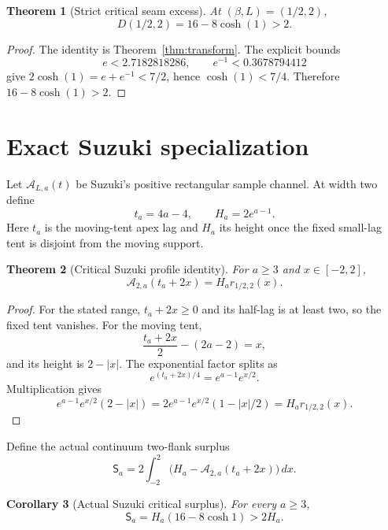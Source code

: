 \documentclass[11pt]{article}
\newtheorem{theorem}{Theorem}[section]
\newtheorem{corollary}[theorem]{Corollary}
\newcommand{\A}{\mathcal A}
\begin{document}
\begin{theorem}[Strict critical seam excess]\label{thm:critical}
At $(\beta,L)=(1/2,2)$,
\begin{equation}\label{eq:critical}
 D(1/2,2)=16-8\cosh(1)>2.
\end{equation}
\end{theorem}

\begin{proof}
The identity is Theorem~\ref{thm:transform}.  The explicit bounds
\[
 e<2.7182818286,\qquad e^{-1}<0.3678794412
\]
give $2\cosh(1)=e+e^{-1}<7/2$, hence $\cosh(1)<7/4$.  Therefore
$16-8\cosh(1)>2$.
\end{proof}

\section{Exact Suzuki specialization}

Let $\A_{L,a}(t)$ be Suzuki's positive rectangular sample channel.  At width two define
\[
 t_a=4a-4,\qquad H_a=2e^{a-1}.
\]
Here $t_a$ is the moving-tent apex lag and $H_a$ its height once the fixed small-lag tent is
disjoint from the moving support.

\begin{theorem}[Critical Suzuki profile identity]\label{thm:suzuki-profile}
For $a\ge3$ and $x\in[-2,2]$,
\begin{equation}\label{eq:suzuki-profile}
 \A_{2,a}(t_a+2x)=H_a r_{1/2,2}(x).
\end{equation}
\end{theorem}

\begin{proof}
For the stated range, $t_a+2x\ge0$ and its half-lag is at least two, so the fixed tent vanishes.
For the moving tent,
\[
 \frac{t_a+2x}{2}-(2a-2)=x,
\]
and its height is $2-|x|$.  The exponential factor splits as
\[
 e^{(t_a+2x)/4}=e^{a-1}e^{x/2}.
\]
Multiplication gives
\[
 e^{a-1}e^{x/2}(2-|x|)
 =2e^{a-1}e^{x/2}(1-|x|/2)=H_a r_{1/2,2}(x).
\]
\end{proof}

Define the actual continuum two-flank surplus
\[
 \mathsf S_a=2\int_{-2}^2\bigl(H_a-\A_{2,a}(t_a+2x)\bigr)\,dx.
\]

\begin{corollary}[Actual Suzuki critical surplus]\label{cor:suzuki-surplus}
For every $a\ge3$,
\begin{equation}\label{eq:suzuki-surplus}
 \mathsf S_a=H_a(16-8\cosh1)>2H_a.
\end{equation}
\end{corollary}
\end{document}
